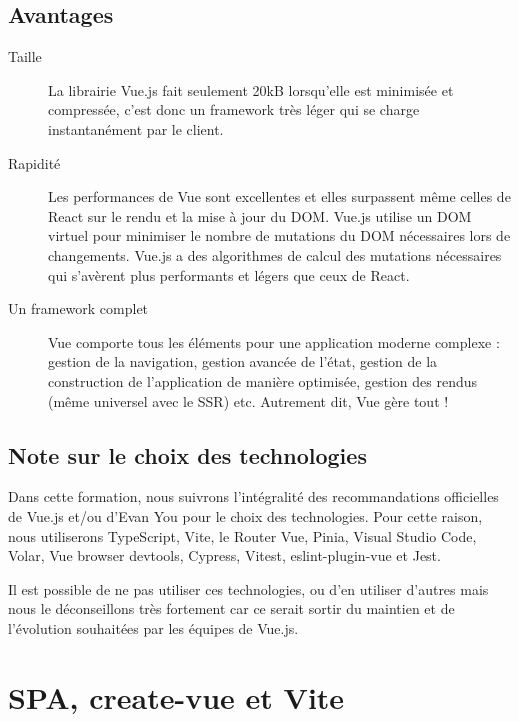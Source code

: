 \subsection{Avantages}
\begin{description}
\item[Taille]
La librairie {\color{monOrange}Vue.js} fait seulement {\color{monOrange}20kB} lorsqu'elle est minimisée et compressée, c'est donc un {\color{monOrange}framework} très léger qui se charge instantanément par le client.

\item[Rapidité]
Les performances de {\color{monOrange}Vue} sont excellentes et elles surpassent même celles de React sur le rendu et la mise à jour du {\color{monOrange}DOM. Vue.js} utilise un {\color{monOrange}DOM} virtuel pour minimiser le nombre de mutations du {\color{monOrange}DOM} nécessaires lors de changements. {\color{monOrange}Vue.js} a des algorithmes de calcul des mutations nécessaires qui s'avèrent plus performants et légers que ceux de {\color{monOrange}React}.

\item[Un framework complet]
{\color{monOrange}Vue} comporte tous les éléments pour une application moderne complexe : gestion de la navigation, gestion avancée de l'état, gestion de la construction de l'application de manière optimisée, gestion des rendus (même universel avec le {\color{monOrange}SSR}) etc. Autrement dit, {\color{monOrange}Vue} gère tout !
\end{description}
\subsection{Note sur le choix des technologies}
Dans cette formation, nous suivrons l'intégralité des recommandations officielles de {\color{monOrange}Vue.js} et/ou d'{\color{monOrange}Evan You} pour le choix des technologies. Pour cette raison, nous utiliserons {\color{monOrange}TypeScript, Vite}, le {\color{monOrange}Router Vue, Pinia, Visual Studio Code, Volar, Vue browser devtools, Cypress, Vitest, eslint-plugin-vue} et {\color{monOrange}Jest}.

Il est possible de ne pas utiliser ces technologies, ou d'en utiliser d'autres mais nous le déconseillons très fortement car ce serait sortir du maintien et de l'évolution souhaitées par les équipes de Vue.js.


\section{SPA, create-vue et Vite}
